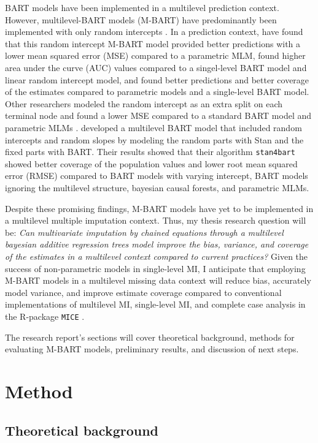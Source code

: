 \documentclass[10pt, a4paper, titlepage]{article}
\begin{document}
BART models have been implemented in a multilevel prediction context. However, multilevel-BART models (M-BART) have predominantly been implemented with only random intercepts \citep{chen2020, wagner2020, tan2016, wundervald2022}. In a prediction context, \citet{wagner2020} have found that this random intercept M-BART model provided better predictions with a lower mean squared error (MSE) compared to a parametric MLM, \citet{tan2016} found higher area under the curve (AUC) values compared to a singel-level BART model and linear random intercept model, and \citet{chen2020} found better predictions and better coverage of the estimates compared to parametric models and a single-level BART model. Other researchers modeled the random intercept as an extra split on each terminal node and found a lower MSE compared to a standard BART model and parametric MLMs \citep{wundervald2022}. \citet{dorie2022} developed a multilevel BART model that included random intercepts and random slopes by modeling the random parts with Stan \citep{lee2017} and the fixed parts with BART. Their results showed that their algorithm \texttt{stan4bart} showed better coverage of the population values and lower root mean squared error (RMSE) compared to BART models with varying intercept, BART models ignoring the multilevel structure, bayesian causal forests, and parametric MLMs.

Despite these promising findings, M-BART models have yet to be implemented in a multilevel multiple imputation context. Thus, my thesis research question will be: \textit{Can multivariate imputation by chained equations through a multilevel bayesian additive regression trees model improve the bias, variance, and coverage of the estimates in a multilevel context compared to current practices?} Given the success of non-parametric models in single-level MI, I anticipate that employing M-BART models in a multilevel missing data context will reduce bias, accurately model variance, and improve estimate coverage compared to conventional implementations of multilevel MI, single-level MI, and complete case analysis in the R-package \texttt{MICE} \citep{buuren2011}.

The research report's sections will cover theoretical background, methods for evaluating M-BART models, preliminary results, and discussion of next steps.

\section{Method}
\subsection{Theoretical background}
\end{document}
